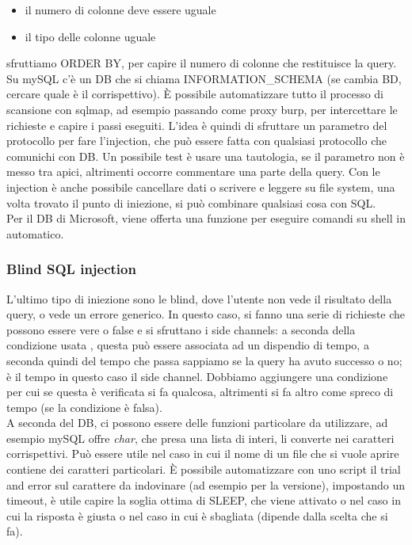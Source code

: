 \documentclass{article}
\begin{document}
\begin{itemize}
\item il numero di colonne deve essere uguale
\item il tipo delle colonne uguale
\end{itemize}
sfruttiamo ORDER BY, per capire il numero di colonne che restituisce la query. Su mySQL c'è un DB che si chiama INFORMATION\_SCHEMA (se cambia BD, cercare quale è il corrispettivo). È possibile automatizzare tutto il processo di scansione con \textsf{sqlmap}, ad esempio passando come proxy burp, per intercettare le richieste e capire i passi eseguiti.
L'idea è quindi di sfruttare un parametro del protocollo per fare l'injection, che può essere fatta con qualsiasi protocollo che comunichi con DB. Un possibile test è usare una tautologia, se il parametro non è messo tra apici, altrimenti occorre commentare una parte della query. Con le injection è anche possibile cancellare dati o scrivere e leggere su file system, una volta trovato il punto di iniezione, si può combinare qualsiasi cosa con SQL.\\ Per il DB di Microsoft, viene offerta una funzione per eseguire comandi su shell in automatico.
\subsubsection{Blind SQL injection}
L'ultimo tipo di iniezione sono le blind, dove l'utente non vede il risultato della query, o vede un errore generico. In questo caso, si fanno una serie di richieste che possono essere vere o false e si sfruttano i side channels: a seconda della condizione usata , questa può essere associata ad un dispendio di tempo, a seconda quindi del tempo che passa sappiamo se la query ha avuto successo o no; è il tempo in questo caso il side channel. Dobbiamo aggiungere una condizione per cui se questa è verificata si fa qualcosa, altrimenti si fa altro come spreco di tempo (se la condizione è falsa).\\ A seconda del DB, ci possono essere delle funzioni particolare da utilizzare, ad esempio mySQL offre \textit{char}, che presa una lista di interi, li converte nei caratteri corrispettivi. Può essere utile nel caso in cui il nome di un file che si vuole aprire contiene dei caratteri particolari. È possibile automatizzare con uno script il trial and error sul carattere da indovinare (ad esempio per la versione), impostando un timeout, è utile capire la soglia ottima di SLEEP, che viene attivato o nel caso in cui la risposta è giusta o nel caso in cui è sbagliata (dipende dalla scelta che si fa).
\end{document}

